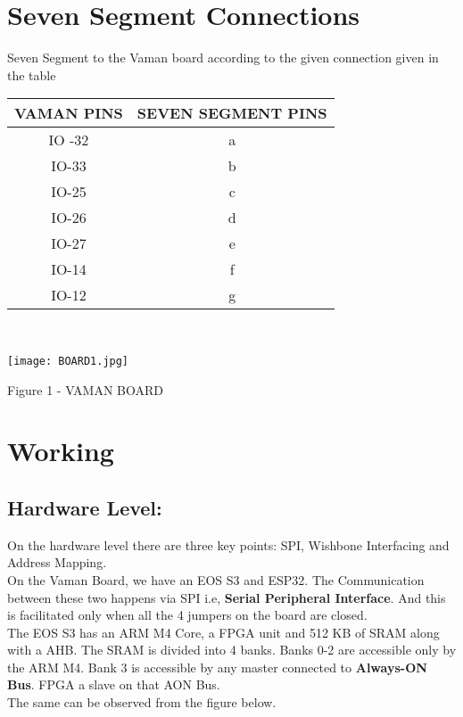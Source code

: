 \documentclass[journal,15pt,twocolumn,tikz, border=5mm]{IEEEtran}
\begin{document}
\section{Seven Segment Connections}
\raggedright
Seven Segment to the Vaman board according to the given connection given in the table\\
\vspace{0.25cm}
\centering
\begin{tabular}{|c|c|}
\hline
VAMAN PINS & SEVEN SEGMENT PINS\\
\hline
IO -32 & a\\
\hline
IO-33 & b\\
\hline
IO-25 & c\\
\hline
IO-26 & d\\
\hline
IO-27 & e\\
\hline
IO-14 & f\\
\hline
IO-12 & g\\
\hline
\end{tabular}\\
\vspace{0.2cm}

\texttt{[image: BOARD1.jpg]}
\centerline{Figure 1 - VAMAN BOARD}
\section{Working}
\raggedright
\subsection{Hardware Level: }
On the hardware level there are three key points: SPI, Wishbone Interfacing and Address Mapping.\\
\vspace{0.2cm}
On the Vaman Board, we have an EOS S3 and ESP32. The Communication between these two happens via SPI i.e, \textbf{Serial Peripheral Interface}. And this is facilitated only when all the 4 jumpers on the board are closed. \\
\vspace{0.25cm}
The EOS S3 has an ARM M4 Core, a FPGA unit and 512 KB of SRAM along with a AHB. The SRAM is divided into 4 banks. Banks 0-2 are accessible only by the ARM M4. Bank 3 is accessible by any master connected to \textbf{Always-ON Bus}. FPGA a slave on that AON Bus. \\
The same can be observed from the figure below.\\
\end{document}
